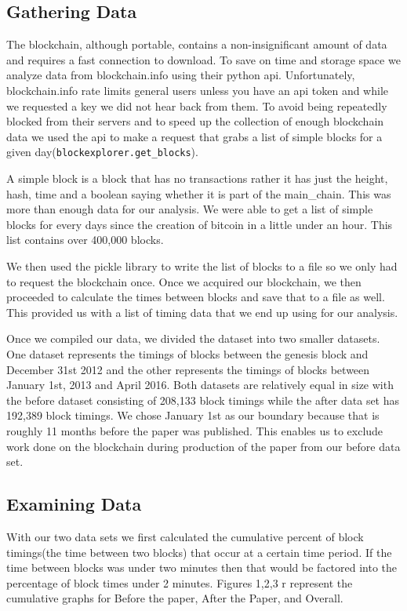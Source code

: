 \documentclass{sig-alternate-05-2015}
\begin{document}
\subsection{Gathering Data}
The blockchain, although portable, contains a non-insignificant amount of data and requires a fast connection to download. To save on time and storage space we analyze data from blockchain.info using their python api. Unfortunately, blockchain.info rate limits general users unless you have an api token and while we requested a key we did not hear back from them. To avoid being repeatedly blocked from their servers and to speed up the collection of enough blockchain data we used the api to make a request that grabs a list of simple blocks for a given day(\texttt{blockexplorer.get\_blocks}).

A simple block is a block that has no transactions rather it has just the height, hash, time and a boolean saying whether it is part of the main\_chain. This was more than enough data for our analysis. We were able to get a list of simple blocks for every days since the creation of bitcoin in a little under an hour. This list contains over 400,000 blocks. 

We then used the pickle library to write the list of blocks to a file so we only had to request the blockchain once. Once we acquired our blockchain, we then proceeded to calculate the times between blocks and save that to a file as well. This provided us with a list of timing data that we end up using for our analysis. 

Once we compiled our data, we divided the dataset into two smaller datasets. One dataset represents the timings of blocks between the genesis block and December 31st 2012 and the other represents the timings of blocks between January 1st, 2013 and April 2016. Both datasets are relatively equal in size with the before dataset consisting of 208,133 block timings while the after data set has 192,389 block timings. We chose January 1st as our boundary because that is roughly 11 months before the paper was published. This enables us to exclude work done on the blockchain during production of the paper from our before data set.


\subsection{Examining Data}
With our two data sets we first calculated the cumulative percent of block timings(the time between two blocks) that occur at a certain time period. If the time between blocks was under two minutes then that would be factored into the percentage of block times under 2 minutes. Figures 1,2,3 r represent the cumulative graphs for Before the paper, After the Paper, and Overall. 
\end{document}
